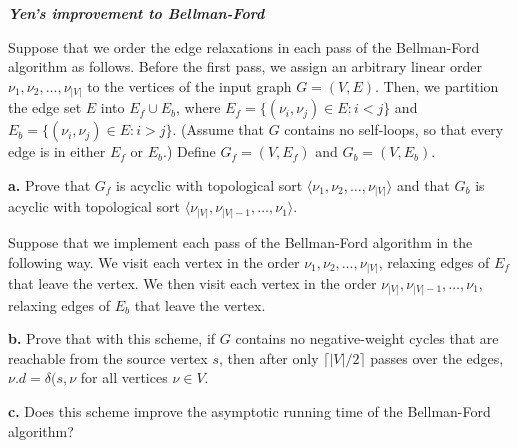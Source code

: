 \textit{\textbf{Yen's improvement to Bellman-Ford}}

Suppose that we order the edge relaxations in each pass of the Bellman-Ford algorithm as follows. 
Before the first pass, we assign an arbitrary linear order $\nu_1,\nu_2,\ldots,\nu_{|V|}$ to the 
vertices of the input graph $G=(V,E)$. Then, we partition the edge set $E$ into $E_f \cup E_b$, 
where $E_f = \{(\nu_i,\nu_j)\in E: i < j\}$ and $E_b = \{(\nu_i,\nu_j)\in E: i > j\}$. (Assume 
that $G$ contains no self-loops, so that every edge is in either $E_f$ or $E_b$.) Define $G_f=(V,E_f)$ 
and $G_b=(V,E_b)$.

\textbf{a.} Prove that $G_f$ is acyclic with topological sort $\langle\nu_1,\nu_2,\ldots,\nu_{|V|}\rangle$ 
and that $G_b$ is acyclic with topological sort $\langle\nu_{|V|},\nu_{|V|-1},\ldots,\nu_{1}\rangle$.

Suppose that we implement each pass of the Bellman-Ford algorithm in the following way. We visit each 
vertex in the order $\nu_1,\nu_2,\ldots,\nu_{|V|}$, relaxing edges of $E_f$ that leave the vertex. 
We then visit each vertex in the order $\nu_{|V|},\nu_{|V|-1},\ldots,\nu_{1}$, relaxing edges of $E_b$ 
that leave the vertex.

\textbf{b.} Prove that with this scheme, if $G$ contains no negative-weight cycles that are reachable from the
 source vertex $s$, then after only $\lceil|V|/2\rceil$ passes over the edges, $\nu.d = \delta(s,\nu$ 
 for all vertices $\nu \in V$.

\textbf{c.} Does this scheme improve the asymptotic running time of the Bellman-Ford algorithm?
